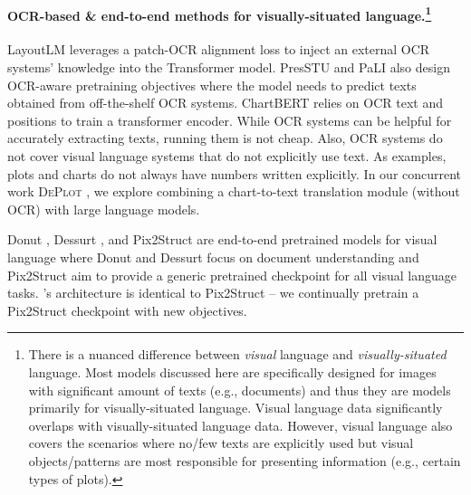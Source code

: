 \paragraph{OCR-based \& end-to-end methods for visually-situated language.\footnote{There is a nuanced difference between \emph{visual} language and \emph{visually-situated} language. Most models discussed here are specifically designed for images with significant amount of texts (e.g., documents) and thus they are models primarily for visually-situated language. Visual language data significantly overlaps with visually-situated language data. However, visual language also covers the scenarios where no/few texts are explicitly used but visual objects/patterns are most responsible for presenting information (e.g., certain types of plots).}}
LayoutLM \citep{xu2020layoutlm,huang2022layoutlmv3} leverages a patch-OCR alignment loss to inject an external OCR systems' knowledge into the Transformer model.
PresSTU \citep{kil2022prestu} and PaLI \citep{chen2022pali} also design OCR-aware pretraining objectives where the model needs to predict texts obtained from off-the-shelf OCR systems. 
ChartBERT \citep{akhtar-etal-2023-reading} relies on OCR text and positions to train a transformer encoder.
While OCR systems can be helpful for accurately extracting texts, running them is not cheap. Also, OCR systems do not cover visual language systems that do not explicitly use text. As examples, plots and charts do not always have numbers written explicitly.
In our concurrent work \textsc{DePlot} \citep{liu2022deplot}, we explore combining a chart-to-text translation module (without OCR) with large language models.

Donut \citep{kim2022ocr}, Dessurt \citep{Davis2022EndtoendDR}, and Pix2Struct \citep{lee2022pix2struct} are end-to-end pretrained models for visual language where Donut and Dessurt focus on document understanding and Pix2Struct aim to provide a generic pretrained checkpoint for all visual language tasks. \model's architecture is identical to Pix2Struct -- we continually pretrain a Pix2Struct checkpoint with new objectives.

